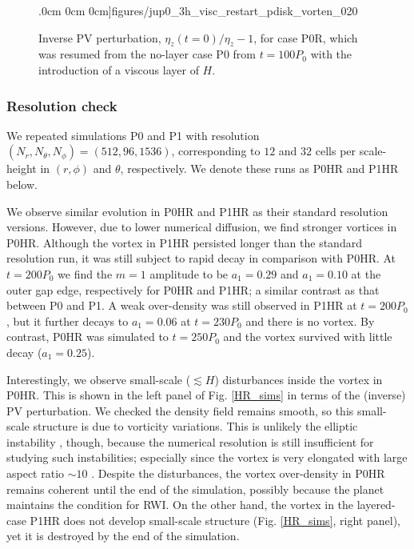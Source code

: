 \begin{figure}
    .0cm 0cm 0cm]{figures/jup0_3h_visc_restart_pdisk_vorten_020}
  \caption{Inverse PV perturbation, $\eta_z(t=0)/\eta_z - 1$, for case P0R, which was resumed
    from the no-layer case P0 from $t=100P_0$ with the introduction of
    a viscous layer of $H$. 
    \label{jup0_3h_visc_restart_vorten}}
\end{figure}

\subsubsection{Resolution check}%
We repeated simulations P0 and P1 with resolution
$(N_r,N_\theta,N_\phi)=(512,96,1536)$, corresponding
to $12$ and $32$ cells per scale-height in $(r,\phi)$ and $\theta$,
respectively. We denote these runs as P0HR and P1HR below. 

We observe similar evolution in P0HR and P1HR as their standard
resolution versions. However, due to lower numerical diffusion, we
find stronger vortices in P0HR. Although the vortex in P1HR persisted
longer than the standard resolution run, it was still subject to rapid
decay in comparison with P0HR. At $t=200P_0$ we find 
the $m=1$ amplitude to be $a_1=0.29$ and $a_1=0.10$ at the outer gap
edge, respectively for P0HR and P1HR; a similar contrast as that
between P0 and P1. A weak over-density was still observed in
P1HR at $t=200P_0$, but it further decays to $a_1=0.06$ at $t=230P_0$
and there is no vortex. By contrast, P0HR was simulated to $t=250P_0$
and the vortex survived with little decay ($a_1=0.25$).   
  
Interestingly, we observe small-scale ($\lesssim H$) disturbances inside the
vortex in P0HR. This is shown in the left panel of  
Fig. \ref{HR_sims} in terms of the (inverse) PV perturbation. We
checked the density field remains smooth, so this small-scale structure is
due to vorticity variations. This is unlikely the elliptic instability
\citep{lesur09}, though, because the numerical resolution is still
insufficient for studying such instabilities; especially since the
vortex is  very elongated with large aspect ratio
$\sim 10$  \cite[so the elliptic instability is weak,][]{lesur09}.  
Despite the disturbances, the vortex over-density in P0HR remains coherent until the
end of the simulation, possibly because the planet maintains the 
condition for RWI. On the other hand, the vortex in the layered-case
P1HR does not develop small-scale structure (Fig. \ref{HR_sims}, right
panel), yet it is destroyed by the end of the simulation.  


